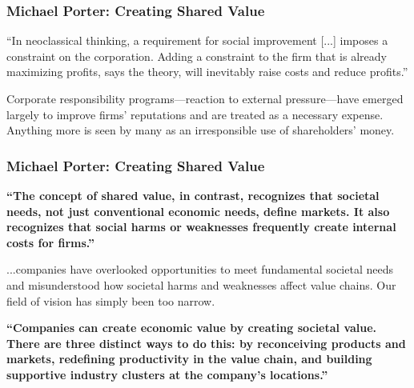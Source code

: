 \documentclass[aspectratio=169, 10pt]{beamer}
\begin{document}
\begin{frame}[t]
\frametitle{\textbf{Michael Porter: Creating Shared Value}}

\begin{tcolorbox}[colback=WHUblue!5!white, colframe=WHUblue, title=The Traditional View, fonttitle=\bfseries, sharp corners=south]
“In neoclassical thinking, a requirement for social improvement [...] imposes a constraint on the corporation. Adding a constraint to the firm that is already maximizing profits, says the theory, will inevitably raise costs and reduce profits.”

\vspace{0.5em}

Corporate responsibility programs—reaction to external pressure—have emerged largely to improve firms’ reputations and are treated as a necessary expense. Anything more is seen by many as an irresponsible use of shareholders’ money.
\end{tcolorbox}

\vspace{1em}

\end{frame}

\begin{frame}[t]
\frametitle{\textbf{Michael Porter: Creating Shared Value}}

\begin{tcolorbox}[colback=WHUblue!5!white, colframe=WHUblue, title=The Shared Value Approach, fonttitle=\bfseries, sharp corners=south]
\textcolor{WHUblue}{\textbf{“The concept of shared value, in contrast, recognizes that societal needs, not just conventional economic needs, define markets. It also recognizes that social harms or weaknesses frequently create internal costs for firms.”}}

\vspace{0.7em}

...companies have overlooked opportunities to meet fundamental societal needs and misunderstood how societal harms and weaknesses affect value chains. Our field of vision has simply been too narrow.

\vspace{0.7em}

\textcolor{WHUblue}{\textbf{“Companies can create economic value by creating societal value. There are three distinct ways to do this: by reconceiving products and markets, redefining productivity in the value chain, and building supportive industry clusters at the company’s locations.”}}
\end{tcolorbox}

\vspace{1em}

\end{frame}
\end{document}
